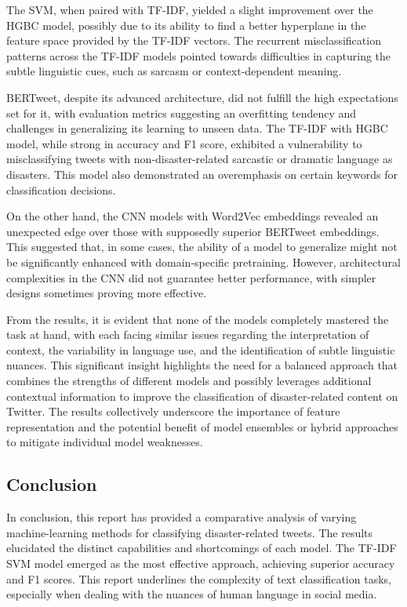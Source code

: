 \documentclass[10pt,table]{article}
\begin{document}
The SVM, when paired with TF-IDF, yielded a slight improvement over the HGBC model, possibly due to its ability to find a better hyperplane in the feature space provided by the TF-IDF vectors. The recurrent misclassification patterns across the TF-IDF models pointed towards difficulties in capturing the subtle linguistic cues, such as sarcasm or context-dependent meaning.

BERTweet, despite its advanced architecture, did not fulfill the high expectations set for it, with evaluation metrics suggesting an overfitting tendency and challenges in generalizing its learning to unseen data. The TF-IDF with HGBC model, while strong in accuracy and F1 score, exhibited a vulnerability to misclassifying tweets with non-disaster-related sarcastic or dramatic language as disasters. This model also demonstrated an overemphasis on certain keywords for classification decisions.

On the other hand, the CNN models with Word2Vec embeddings revealed an unexpected edge over those with supposedly superior BERTweet embeddings. This suggested that, in some cases, the ability of a model to generalize might not be significantly enhanced with domain-specific pretraining. However, architectural complexities in the CNN did not guarantee better performance, with simpler designs sometimes proving more effective.

From the results, it is evident that none of the models completely mastered the task at hand, with each facing similar issues regarding the interpretation of context, the variability in language use, and the identification of subtle linguistic nuances. This significant insight highlights the need for a balanced approach that combines the strengths of different models and possibly leverages additional contextual information to improve the classification of disaster-related content on Twitter. The results collectively underscore the importance of feature representation and the potential benefit of model ensembles or hybrid approaches to mitigate individual model weaknesses.

\subsection{Conclusion}
In conclusion, this report has provided a comparative analysis of varying machine-learning methods for classifying disaster-related tweets. The results elucidated the distinct capabilities and shortcomings of each model. The TF-IDF SVM model emerged as the most effective approach, achieving superior accuracy and F1 scores. This report underlines the complexity of text classification tasks, especially when dealing with the nuances of human language in social media.
\end{document}
